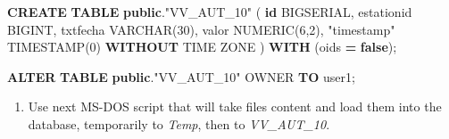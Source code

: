 \documentclass[12pt,twoside]{reedthesis}
\newenvironment{Shaded}{\begin{snugshade}}{\end{snugshade}}
\newcommand{\DataTypeTok}[1]{\textcolor[rgb]{0.13,0.29,0.53}{#1}}
\newcommand{\DecValTok}[1]{\textcolor[rgb]{0.00,0.00,0.81}{#1}}
\newcommand{\KeywordTok}[1]{\textcolor[rgb]{0.13,0.29,0.53}{\textbf{#1}}}
\newcommand{\NormalTok}[1]{#1}
\newcommand{\OperatorTok}[1]{\textcolor[rgb]{0.81,0.36,0.00}{\textbf{#1}}}
\newcommand{\OtherTok}[1]{\textcolor[rgb]{0.56,0.35,0.01}{#1}}
\providecommand{\tightlist}{%
  \setlength{\itemsep}{0pt}\setlength{\parskip}{0pt}}
\begin{document}
\vspace{0.4cm}
\begin{Shaded}
\begin{Highlighting}[]
        \KeywordTok{CREATE} \KeywordTok{TABLE} \KeywordTok{public}\NormalTok{.}\OtherTok{"VV_AUT_10"}\NormalTok{ (}
          \KeywordTok{id}\NormalTok{ BIGSERIAL,}
\NormalTok{          estationid BIGINT,}
\NormalTok{          txtfecha }\DataTypeTok{VARCHAR}\NormalTok{(}\DecValTok{30}\NormalTok{),}
\NormalTok{          valor }\DataTypeTok{NUMERIC}\NormalTok{(}\DecValTok{6}\NormalTok{,}\DecValTok{2}\NormalTok{),}
          \OtherTok{"timestamp"} \DataTypeTok{TIMESTAMP}\NormalTok{(}\DecValTok{0}\NormalTok{) }\KeywordTok{WITHOUT} \DataTypeTok{TIME} \DataTypeTok{ZONE}\NormalTok{ ) }\KeywordTok{WITH}\NormalTok{ (oids }\OperatorTok{=} \KeywordTok{false}\NormalTok{);}
        
        \KeywordTok{ALTER} \KeywordTok{TABLE} \KeywordTok{public}\NormalTok{.}\OtherTok{"VV_AUT_10"}
\NormalTok{          OWNER }\KeywordTok{TO}\NormalTok{ user1;}
\end{Highlighting}
\end{Shaded}
\normalsize
\begin{enumerate}
\def\labelenumi{\arabic{enumi}.}
\setcounter{enumi}{4}
\tightlist
\item
  Use next MS-DOS script that will take files content and load them into the database, temporarily to \emph{Temp}, then to \emph{VV\_AUT\_10}.
\end{enumerate}
\scriptsize
\end{document}

